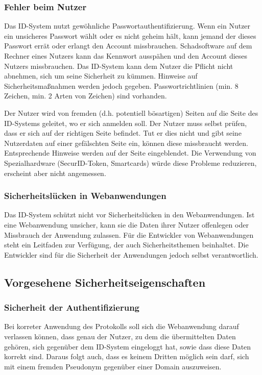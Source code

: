 \documentclass[parskip=half]{scrartcl}
\begin{document}
\subsubsection{Fehler beim Nutzer}
Das ID-System nutzt gewöhnliche Passwortauthentifizierung.
Wenn ein Nutzer ein unsicheres Passwort wählt oder es nicht geheim hält, kann jemand der dieses Passwort errät oder erlangt den Account missbrauchen.
Schadsoftware auf dem Rechner eines Nutzers kann das Kennwort ausspähen und den Account dieses Nutzers missbrauchen.
Das ID-System kann dem Nutzer die Pflicht nicht abnehmen, sich um seine Sicherheit zu kümmen. Hinweise auf Sicherheitsmaßnahmen werden jedoch gegeben.
Passwortrichtlinien (min. 8 Zeichen, min. 2 Arten von Zeichen) sind vorhanden.

Der Nutzer wird von fremden (d.h. potentiell bösartigen) Seiten auf die Seite des ID-Systems geleitet, wo er sich anmelden soll.
Der Nutzer muss selbst prüfen, dass er sich auf der richtigen Seite befindet.
Tut er dies nicht und gibt seine Nutzerdaten auf einer gefälschten Seite ein, können diese missbraucht werden.
Entsprechende Hinweise werden auf der Seite eingeblendet.
Die Verwendung von Spezialhardware (SecurID-Token, Smartcards) würde diese Probleme reduzieren, erscheint aber nicht angemessen.

\subsubsection{Sicherheitslücken in Webanwendungen}
Das ID-System schützt nicht vor Sicherheitslücken in den Webanwendungen.
Ist eine Webanwendung unsicher, kann sie die Daten ihrer Nutzer offenlegen oder Missbrauch der Anwendung zulassen.
Für die Entwickler von Webanwendungen steht ein Leitfaden zur Verfügung, der auch Sicherheitsthemen beinhaltet.
Die Entwickler sind für die Sicherheit der Anwendungen jedoch selbst verantwortlich.

\subsection{Vorgesehene Sicherheitseigenschaften}
\subsubsection{Sicherheit der Authentifizierung}
Bei korreter Anwendung des Protokolls soll sich die Webanwendung darauf verlassen können,
dass genau der Nutzer, zu dem die übermittelten Daten gehören, sich gegenüber dem ID-System eingeloggt hat,
sowie dass diese Daten korrekt sind.
Daraus folgt auch, dass es keinem Dritten möglich sein darf, sich mit einem fremden Pseudonym gegenüber einer Domain auszuweisen.
\end{document}

